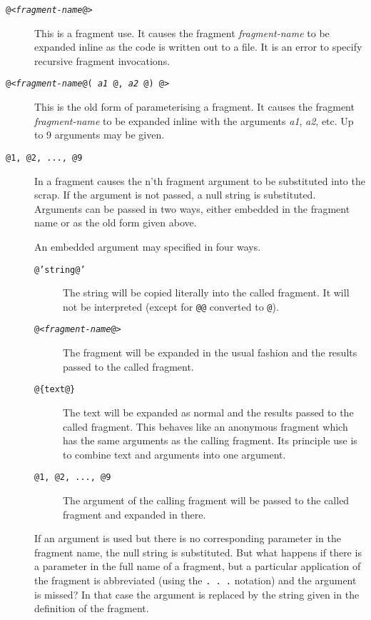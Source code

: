 \documentclass[a4paper]{report}
\begin{document}
\begin{description}
\item[\tt @<{\em fragment-name\/}@>]
  This is a fragment use. It causes the fragment
  {\em fragment-name\/} to be expanded inline as the code is written out
  to a file. It is an error to specify recursive fragment invocations.
\item[\tt @<{\em fragment-name\/}@( {\em a1} @, {\em a2} @) @>] This
  is the old form of parameterising a fragment. It causes the fragment
  {\em fragment-name\/} to be expanded inline with the arguments {\em a1},
    {\em a2}, etc. Up to 9 arguments may be given.
\item[\tt @1, @2, ..., @9] In a fragment causes the n'th fragment
      argument to be substituted into the scrap.  If the argument
      is not passed, a null string is substituted.
      Arguments can be passed in two ways, either embedded in the
      fragment
      name or as the old form given above.

      An embedded argument may specified in four ways.
      \begin{description}
      \item[\tt @'string@']
      The string will be copied literally into the called fragment.
      It will not be interpreted (except for \texttt{@@} converted
            to \texttt{@}).
      \item[\tt @<{\em fragment-name\/}@>]
      The fragment will be expanded in the usual fashion and the results
      passed to the called fragment.
      \item[\tt @\{text@\}]
      The text will be expanded as normal and the results passed to
      the called fragment. This behaves like an anonymous fragment which has
      the same arguments as the calling fragment. Its principle use is
      to combine text and arguments into one argument.
      \item[\tt @1, @2, ..., @9]
      The argument of the calling fragment will be passed to the called
      fragment and expanded in there.
      \end{description}

      If an argument is used but there is no corresponding parameter
      in the fragment name, the null string is substituted. But what
      happens if there is a parameter in the full name of a fragment,
      but a particular application of the fragment is abbreviated
      (using the \verb|. . .| notation) and the argument is missed? In
      that case the argument is replaced by the string given in the
      definition of the fragment.


\end{description}
\end{document}
